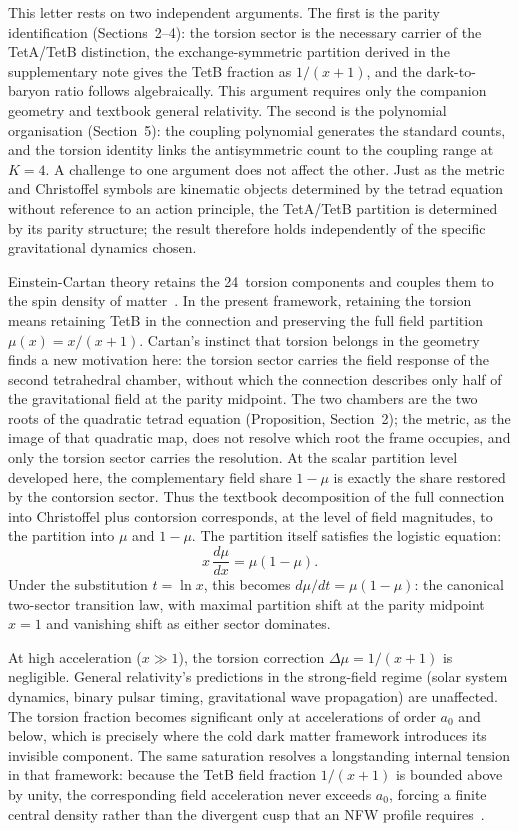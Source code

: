\documentclass[twocolumn]{iopjournal}
\begin{document}
This letter rests on two independent arguments. The first is the
parity identification (Sections~2--4): the torsion sector is the
necessary carrier of the TetA/TetB distinction, the
exchange-symmetric partition derived in the
supplementary note gives the TetB fraction as
$1/(x{+}1)$, and the dark-to-baryon ratio follows algebraically.
This argument requires only the companion geometry and textbook
general relativity. The second is the polynomial organisation
(Section~5): the coupling polynomial generates the standard
counts, and the torsion identity links the antisymmetric count to
the coupling range at $K = 4$. A challenge to one argument does
not affect the other. Just as the metric and Christoffel
symbols are kinematic objects determined by the tetrad equation
without reference to an action principle, the TetA/TetB
partition is determined by its parity structure; the result
therefore holds independently of the specific gravitational
dynamics chosen.

Einstein-Cartan theory retains the 24~torsion components and
couples them to the spin density of
matter~\cite{Hehl1976}. In the present framework, retaining the
torsion means retaining TetB in the connection and preserving
the full field partition $\mu(x) = x/(x{+}1)$. Cartan's
instinct that torsion belongs in the geometry finds a new
motivation here: the torsion sector carries the field response
of the second tetrahedral chamber, without which the connection
describes only half of the gravitational field at the parity
midpoint. The two chambers are the two roots of the quadratic
tetrad equation (Proposition, Section~2); the metric, as the
image of that quadratic map, does not resolve which root the
frame occupies, and only the torsion sector carries the
resolution. At the scalar partition level developed here, the
complementary field share $1-\mu$ is exactly the share restored
by the contorsion sector. Thus the textbook decomposition of
the full connection into Christoffel plus contorsion
corresponds, at the level of field magnitudes, to the partition
into $\mu$ and $1-\mu$. The partition itself satisfies the
logistic equation:
\begin{equation}
  x\,\frac{d\mu}{dx} = \mu(1-\mu).
  \label{eq:logistic}
\end{equation}
Under the substitution $t = \ln x$, this becomes
$d\mu/dt = \mu(1-\mu)$: the canonical two-sector transition
law, with maximal partition shift at the parity midpoint
$x = 1$ and vanishing shift as either sector dominates.

At high acceleration ($x \gg 1$), the torsion correction
$\Delta\mu = 1/(x{+}1)$ is negligible. General relativity's
predictions in the strong-field regime (solar system
dynamics, binary pulsar timing, gravitational wave propagation)
are unaffected. The torsion fraction becomes significant
only at accelerations of order $a_0$ and below, which is
precisely where the cold dark matter framework introduces its
invisible component. The same saturation resolves a longstanding
internal tension in that framework: because the TetB field
fraction $1/(x{+}1)$ is bounded above by unity, the
corresponding field acceleration never exceeds $a_0$, forcing a
finite central density rather than the divergent cusp that an
NFW profile requires~\cite{NFW1996}.
\end{document}
